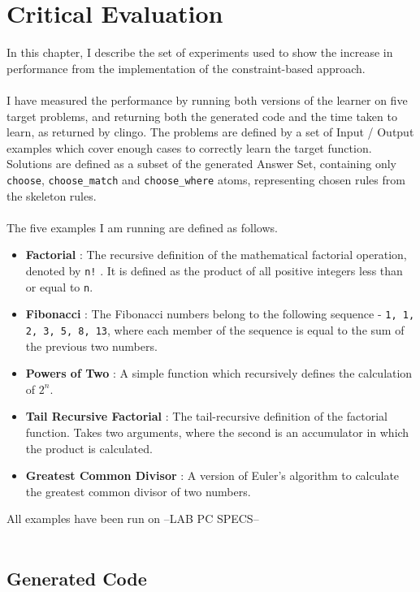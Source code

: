 \chapter{Critical Evaluation}

In this chapter, I describe the set of experiments used to show the increase in performance from the implementation of the constraint-based approach. \\ \\
I have measured the performance by running both versions of the learner on five target problems, and returning both the generated code and the time taken to learn, as returned by clingo. The problems are defined by a set of Input / Output examples which cover enough cases to correctly learn the target function. Solutions are defined as a subset of the generated Answer Set, containing only \lstinline{choose}, \lstinline{choose_match} and \lstinline{choose_where} atoms, representing chosen rules from the skeleton rules. \\ \\%
The five examples I am running are defined as follows.
\begin{itemize}
\item \textbf{Factorial} : The recursive definition of the mathematical factorial operation, denoted by \lstinline{n!} . It is defined as the product of all positive integers less than or equal to \lstinline{n}.%
\item \textbf{Fibonacci} : The Fibonacci numbers belong to the following sequence - \lstinline{1, 1, 2, 3, 5, 8, 13}, where each member of the sequence is equal to the sum of the previous two numbers. %
\item \textbf{Powers of Two} : A simple function which recursively defines the calculation of $2^n$.
\item \textbf{Tail Recursive Factorial} : The tail-recursive definition of the factorial function. Takes two arguments, where the second is an accumulator in which the product is calculated.
\item \textbf{Greatest Common Divisor} : A version of Euler's algorithm to calculate the greatest common divisor of two numbers.
\end{itemize}
All examples have been run on --LAB PC SPECS-- \\ \\

\pagebreak

\section{Generated Code}

